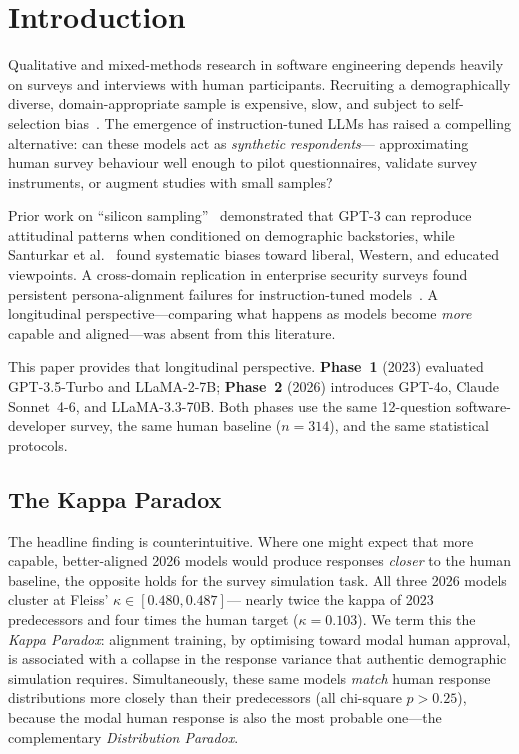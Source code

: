\documentclass[12pt,a4paper]{article}
\newcommand{\kp}{\textit{Kappa Paradox}\xspace}
\newcommand{\distrpar}{\textit{Distribution Paradox}\xspace}
\begin{document}
\newpage
\tableofcontents
\newpage

\section{Introduction}
\label{sec:intro}

Qualitative and mixed-methods research in software engineering depends
heavily on surveys and interviews with human participants.
Recruiting a demographically diverse, domain-appropriate sample is
expensive, slow, and subject to self-selection bias~\cite{ssrn6829506}.
The emergence of instruction-tuned LLMs has raised a compelling
alternative: can these models act as \emph{synthetic respondents}---
approximating human survey behaviour well enough to pilot questionnaires,
validate survey instruments, or augment studies with small samples?

Prior work on ``silicon sampling''~\cite{argyle2023} demonstrated
that GPT-3 can reproduce attitudinal patterns when conditioned on
demographic backstories, while Santurkar et al.~\cite{santurkar2023}
found systematic biases toward liberal, Western, and educated viewpoints.
A cross-domain replication in enterprise security surveys found
persistent persona-alignment failures for instruction-tuned
models~\cite{ssrn6829506}.
A longitudinal perspective---comparing what happens as models become
\emph{more} capable and aligned---was absent from this literature.

This paper provides that longitudinal perspective.
\textbf{Phase~1} (2023) evaluated GPT-3.5-Turbo and LLaMA-2-7B;
\textbf{Phase~2} (2026) introduces GPT-4o, Claude Sonnet~4-6, and
LLaMA-3.3-70B.
Both phases use the same 12-question software-developer survey, the same
human baseline ($n{=}314$), and the same statistical protocols.

\subsection*{The Kappa Paradox}

The headline finding is counterintuitive.
Where one might expect that more capable, better-aligned 2026 models
would produce responses \emph{closer} to the human baseline, the opposite
holds for the survey simulation task.
All three 2026 models cluster at Fleiss' $\kappa \in [0.480, 0.487]$---
nearly twice the kappa of 2023 predecessors and four times the human
target ($\kappa{=}0.103$).
We term this the \kp: alignment training, by optimising toward modal
human approval, is associated with a collapse in the response variance
that authentic demographic simulation requires.
Simultaneously, these same models \emph{match} human response
distributions more closely than their predecessors (all chi-square
$p > 0.25$), because the modal human response is also the most probable
one---the complementary \distrpar.
\end{document}
